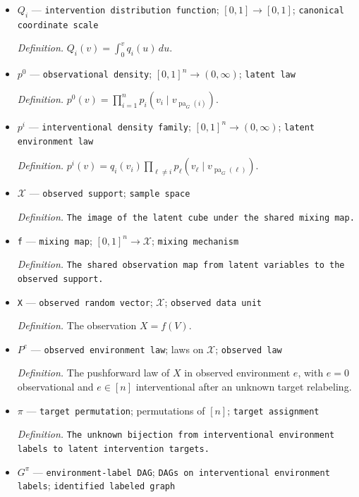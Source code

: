 \documentclass{article}
\begin{document}
\begin{itemize}
  \par\smallskip\noindent\emph{Definition.} The perfect-intervention density replacing \(p_i\) at target \(i\).
  \item \(Q_i\) --- \texttt{intervention distribution function}; \([0,1]\to[0,1]\); \texttt{canonical coordinate scale}
  \par\smallskip\noindent\emph{Definition.} \(Q_i(v)=\int_0^v q_i(u)\,du\).
  \item \(p^0\) --- \texttt{observational density}; \([0,1]^n\to(0,\infty)\); \texttt{latent law}
  \par\smallskip\noindent\emph{Definition.} \(p^0(v)=\prod_{i=1}^{n}p_i(v_i\mid v_{\operatorname{pa}_G(i)})\).
  \item \(p^i\) --- \texttt{interventional density family}; \([0,1]^n\to(0,\infty)\); \texttt{latent environment law}
  \par\smallskip\noindent\emph{Definition.} \(p^i(v)=q_i(v_i)\prod_{\ell\ne i}p_\ell(v_\ell\mid v_{\operatorname{pa}_G(\ell)})\).
  \item \(\mathcal X\) --- \texttt{observed support}; \texttt{sample space}
  \par\smallskip\noindent\emph{Definition.} \texttt{The image of the latent cube under the shared mixing map.}
  \item \texttt{f} --- \texttt{mixing map}; \([0,1]^n\to\mathcal X\); \texttt{mixing mechanism}
  \par\smallskip\noindent\emph{Definition.} \texttt{The shared observation map from latent variables to the observed support.}
  \item \texttt{X} --- \texttt{observed random vector}; \(\mathcal X\); \texttt{observed data unit}
  \par\smallskip\noindent\emph{Definition.} The observation \(X=f(V)\).
  \item \(P^e\) --- \texttt{observed environment law}; laws on \(\mathcal X\); \texttt{observed law}
  \par\smallskip\noindent\emph{Definition.} The pushforward law of \(X\) in observed environment \(e\), with \(e=0\) observational and \(e\in[n]\) interventional after an unknown target relabeling.
  \item \(\pi\) --- \texttt{target permutation}; permutations of \([n]\); \texttt{target assignment}
  \par\smallskip\noindent\emph{Definition.} \texttt{The unknown bijection from interventional environment labels to latent intervention targets.}
  \item \(G^\pi\) --- \texttt{environment-\allowbreak{}label DAG}; \texttt{DAGs on interventional environment labels}; \texttt{identified labeled graph}

\end{itemize}
\end{document}
